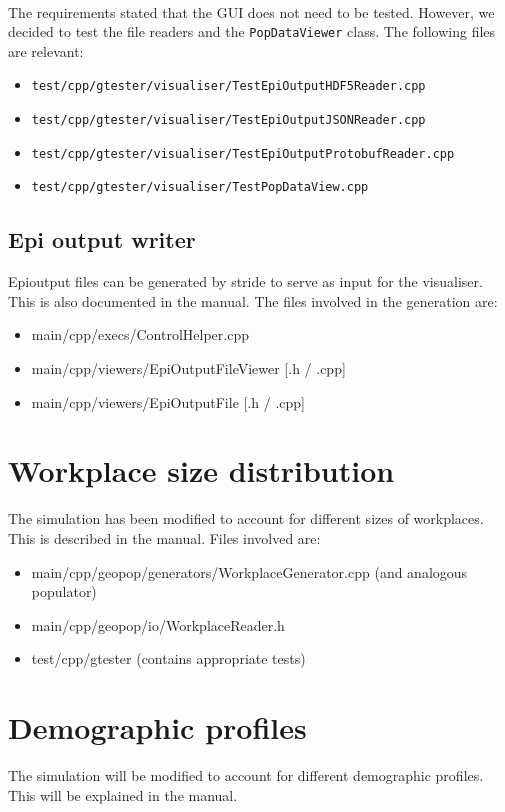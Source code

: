 \documentclass{article}
\begin{document}
\paragraph{} The requirements stated that the GUI does not need to be tested. However, we decided to test the file readers and the \texttt{PopDataViewer} class. The following files are relevant:
\begin{itemize}
\item \texttt{test/cpp/gtester/visualiser/TestEpiOutputHDF5Reader.cpp}
\item \texttt{test/cpp/gtester/visualiser/TestEpiOutputJSONReader.cpp}
\item \texttt{test/cpp/gtester/visualiser/TestEpiOutputProtobufReader.cpp}
\item \texttt{test/cpp/gtester/visualiser/TestPopDataView.cpp}
\end{itemize}

\subsection{Epi output writer}

Epioutput files can be generated by stride to serve as input for the visualiser. This is also documented in the manual. The files involved in the generation are:

\begin{itemize}
\item main/cpp/execs/ControlHelper.cpp
\item main/cpp/viewers/EpiOutputFileViewer [.h / .cpp]
\item main/cpp/viewers/EpiOutputFile [.h / .cpp]
\end{itemize}

\section{Workplace size distribution}
The simulation has been modified to account for different sizes of workplaces. This is described in the manual. Files involved are:

\begin{itemize}
\item main/cpp/geopop/generators/WorkplaceGenerator.cpp (and analogous populator)
\item main/cpp/geopop/io/WorkplaceReader.h
\item test/cpp/gtester (contains appropriate tests)
\end{itemize}

\section{Demographic profiles}
The simulation will be modified to account for different demographic profiles. This will be explained in the manual.
\end{document}
